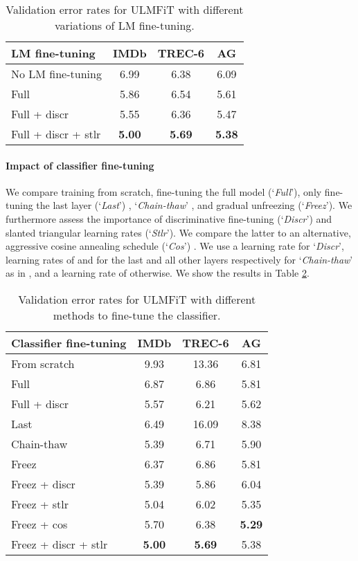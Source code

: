\documentclass[11pt,a4paper]{article}
\begin{document}
\begin{table}
\centering
\begin{tabular}{l c c c}
\toprule
LM fine-tuning & IMDb & TREC-6 & AG\\
 \midrule
No LM fine-tuning & 6.99 & 6.38 & 6.09\\
Full & 5.86 & 6.54 & 5.61 \\
Full + discr & 5.55 & 6.36 & 5.47\\
Full + discr + stlr & \textbf{5.00} & \textbf{5.69} & \textbf{5.38} \\
\bottomrule
\end{tabular}
\caption{Validation error rates for ULMFiT with different variations of LM fine-tuning.}
\label{tab:lm-fine-tuning}
\end{table}

\paragraph{Impact of classifier fine-tuning} We compare training from scratch, fine-tuning the full model (`\emph{Full}'), only fine-tuning the last layer (`\emph{Last}') \cite{donahue2014decaf}, `\emph{Chain-thaw}' \cite{Felbo2017}, and gradual unfreezing (`\emph{Freez}'). We furthermore assess the importance of discriminative fine-tuning (`\emph{Discr}') and slanted triangular learning rates (`\emph{Stlr}'). We compare the latter to an alternative, aggressive cosine annealing schedule (`\emph{Cos}') \cite{Loshchilov2017}. We use a learning rate  for `\emph{Discr}', learning rates of  and  for the last and all other layers respectively for `\emph{Chain-thaw}' as in \cite{Felbo2017}, and a learning rate of  otherwise. We show the results in Table \ref{tab:target-task-fine-tuning}. 

\begin{table}
\centering
\begin{tabular}{l c c c}
\toprule
Classifier fine-tuning & IMDb & TREC-6 & AG \\
 \midrule
From scratch & 9.93 & 13.36 & 6.81 \\
Full & 6.87 & 6.86 & 5.81 \\
Full + discr & 5.57 & 6.21 & 5.62\\
Last & 6.49 & 16.09 & 8.38 \\
Chain-thaw & 5.39 & 6.71 & 5.90\\
Freez & 6.37 & 6.86 & 5.81 \\
Freez + discr & 5.39 & 5.86 & 6.04 \\
Freez + stlr & 5.04 & 6.02 & 5.35 \\
Freez + cos & 5.70 & 6.38 & \textbf{5.29} \\
Freez + discr + stlr & \textbf{5.00} & \textbf{5.69} & 5.38 \\
\bottomrule
\end{tabular}
\caption{Validation error rates for ULMFiT with different methods to fine-tune the classifier.}
\label{tab:target-task-fine-tuning}
\end{table}
\end{document}
